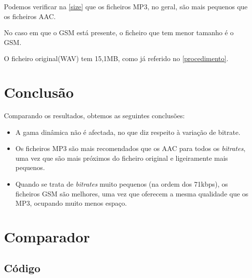 \documentclass[a4paper]{report}
\begin{document}
Podemos verificar na \autoref{size} que os ficheiros \gls{MP3}, no geral, são mais pequenos que os ficheiros \gls{AAC}.

No caso em que o \gls{GSM} está presente, o ficheiro que tem menor tamanho é o \gls{GSM}.

O ficheiro original(WAV) tem 15,1MB, como já referido no \autoref{procedimento}.
\chapter{Conclusão}
\label{conclusion}

Comparando os resultados, obtemos as seguintes conclusões:
\begin{itemize}
\item A gama dinâmica não é afectada, no que diz respeito à variação de \gls{bitrate}.
\item Os ficheiros \gls{MP3} são mais recomendados que os \gls{AAC} para todos os \textit{bitrates}, uma vez que são mais próximos do ficheiro original e ligeiramente mais pequenos.
\item Quando se trata de \textit{bitrates} muito pequenos (na ordem dos 71kbps), os ficheiros \gls{GSM} são melhores, uma vez que oferecem a mesma qualidade que os \gls{MP3}, ocupando muito menos espaço.
\end{itemize}

\clearpage

\renewcommand*{\glossaryname}{Glossário}
\printglossaries

\clearpage
{}



\appendix
\chapter{Comparador}
\label{pythontool}
\section{Código}
\label{code}

\end{document}
